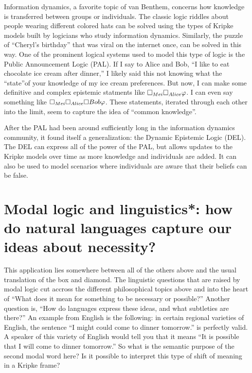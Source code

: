 Information dynamics, a favorite topic of van Benthem, concerns how knowledge is transferred between groups or individuals. The classic logic
riddles about people wearing different colored hats can be solved using the types of Kripke models built by logicians who study information
dynamics. Similarly, the puzzle of ``Cheryl's birthday'' that was viral on the internet once, can be solved in this way. One of the prominent
logical systems used to model this type of logic is the Public Announcement Logic (PAL). If I say to Alice and Bob, ``I like to eat chocolate
ice cream after dinner,'' I likely said this not knowing what the ``state''of your knowledge of my ice cream preferences. But now, I can make some
definitive and complex epistemic statments like $\square_{Mei} \square_{Alice} \varphi$. I can even say something like $\square_{Mei} \square_{Alice}
\square{Bob} \varphi$. These statements, iterated through each other into the limit, seem to capture the idea of ``common knowledge''. 

After the PAL had been around sufficiently long in the information dynamics community, it found itself a generalization: the Dynamic Epistemic
Logic (DEL). The DEL can express all of the power of the PAL, but allows updates to the Kripke models over time as more knowledge and individuals
are added. It can also be used to model scenarios where individuals are aware that their beliefs can be false.

\section{Modal logic and linguistics*: how do natural languages capture our ideas about necessity?}

This application lies somewhere between all of the others above and the usual translation of the box and diamond. The linguistic questions that are
raised by modal logic cut accross the different philosophical topics above and into the heart of ``What does it mean for something to be necessary
or possible?'' Another question is, ``How do languages express these ideas, and what subtleties are there?'' An example from English is the
following: in certain regional varieties of English, the sentence ``I might could come to dinner tomorrow.'' is perfectly valid. A speaker
of this variety of English would tell you that it means ``It is possible that I will come to dinner tomorrow.'' So what is the semantic purpose
of the second modal word here? Is it possible to interpret this type of shift of meaning in a Kripke frame?

